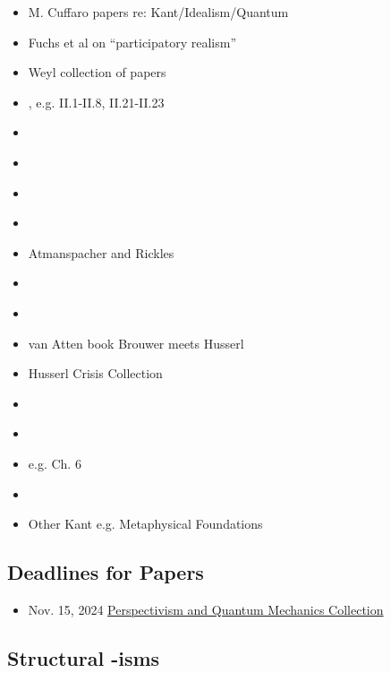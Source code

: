 \begin{itemize}
    \item M. Cuffaro papers re: Kant/Idealism/Quantum
    \item Fuchs et al on ``participatory realism''
    \item Weyl collection of papers
    \item \cite{SchilppCassirer}, e.g. II.1-II.8, II.21-II.23
    \item \cite{Adorno1940}
    \item \cite{Clifford1878}
    \item \cite{Ewing1934}
    \item \cite{Kilmister1994}
    \item Atmanspacher and Rickles
    \item \cite{Cartwright1983}
    \item \cite{Torretti1999}
    \item van Atten book Brouwer meets Husserl
    \item Husserl Crisis Collection
    \item \cite{Zahar2001}
    \item \cite{Zahar2007}
    \item \cite{Kelsen1946} e.g. Ch. 6
    \item \cite{Redhead1987}
    \item Other Kant e.g. Metaphysical Foundations



\end{itemize}




\subsection{Deadlines for Papers}

\begin{itemize}
    \item Nov. 15, 2024 \href{https://link.springer.com/collections/cabhjbifbf}{Perspectivism and Quantum Mechanics Collection}
\end{itemize}










\subsection{Structural -isms}


